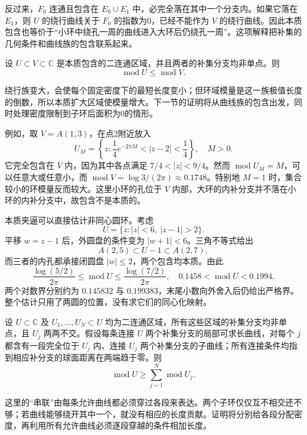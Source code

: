 \ProseParagraphBreak
反过来，\(F_0\) 连通且包含在 \(E_0\cup E_1\) 中，必完全落在其中一个分支内。如果它落在 \(E_1\)，则 \(U\) 的绕行曲线关于 \(F_0\) 的指数为0，已经不能作为 \(V\) 的绕行曲线。因此本质包含也等价于“小环中绕孔一周的曲线进入大环后仍绕孔一周”。这项解释把补集的几何条件和曲线族的包含联系起来。

\begin{proposition}\label{b3:prop:08-essential-monotonicity}
设 \(U\subset V\subset\mathbb C\) 是本质包含的二连通区域，并且两者的补集分支均非单点。则
\[
 \operatorname{mod}U\le\operatorname{mod}V.
\]
\end{proposition}

绕行族变大，会使每个固定密度下的最短长度变小；但环域模量是这一族极值长度的倒数，所以本质扩大区域使模量增大。下一节的证明将从曲线族的包含出发，同时处理密度限制到子环后面积为0的情形。

\ProseParagraphBreak
例如，取 \(V=A(1,3)\)，在点2附近放入
\[
 U_M=\left\{z:\frac14e^{-2\pi M}<|z-2|<\frac14\right\},
 \quad M>0.
\]
它完全包含在 \(V\) 内，因为其中各点满足 \(7/4<|z|<9/4\)。然而 \(\operatorname{mod}U_M=M\)，可以任意大或任意小，而 \(\operatorname{mod}V=\log3/(2\pi)\approx0.1748\)。特别地 \(M=1\) 时，集合较小的环模量反而较大。这里小环的孔位于 \(V\) 内部，大环的内补分支并不落在小环的内补分支中，故包含不是本质的。

\ProseParagraphBreak
本质夹逼可以直接估计非同心圆环。考虑
\[
 U=\{z:|z|<6,\ |z-1|>2\}.
\]
平移 \(w=z-1\) 后，外圆盘的条件变为 \(|w+1|<6\)。三角不等式给出
\[
 A(2,5)\subset U-1\subset A(2,7),
\]
而三者的内孔都承接闭圆盘 \(|w|\le2\)，两个包含均本质。由此
\[
 \frac{\log(5/2)}{2\pi}
 \le\operatorname{mod}U\le
 \frac{\log(7/2)}{2\pi},
 \quad 0.1458<\operatorname{mod}U<0.1994.
\]
两个对数界分别约为 \(0.145832\) 与 \(0.199383\)，末尾小数向外舍入后仍给出严格界。整个估计只用了两圆的位置，没有求它们的同心化映射。

\begin{proposition}[串联环域的模量比较]\label{b3:prop:08-series-annuli}
设 \(U\subset\mathbb C\) 及 \(U_1,\ldots,U_N\subset U\) 均为二连通区域，所有这些区域的补集分支均非单点，且 \(U_j\) 两两不交。假设每条连接 \(U\) 两个补集分支的局部可求长曲线，对每个 \(j\) 都含有一段完全位于 \(U_j\) 内、连接 \(U_j\) 两个补集分支的子曲线；所有连接条件均指到相应补分支的球面距离在两端趋于零。则
\[
 \operatorname{mod}U\ge\sum_{j=1}^N\operatorname{mod}U_j.
\]
\end{proposition}

这里的“串联”由每条允许曲线都必须穿过各段来表达。两个子环仅仅互不相交还不够；若曲线能够绕开其中一个，就没有相应的长度贡献。证明将分别给各段分配密度，再利用所有允许曲线必须逐段穿越的条件相加长度。

